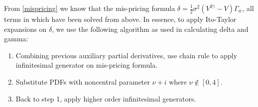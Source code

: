 From \eqref{mispricing} we know that the mis-pricing formula $\delta = \frac{1}{2} \sigma^2 (V^{2\gamma}-V) \Gamma_{\bar{w}}$, all terms in which have been solved from above. In essence, to apply Ito-Taylor expansions on $\delta$, we use the following algorithm as used in calculating delta and gamma:

\begin{enumerate}
    \item Combining previous auxiliary partial derivatives, use chain rule to apply infinitesimal generator on mis-pricing formula.
    \item Substitute PDFs with noncentral parameter $\nu+i$ where $\nu \notin [0,4]$.
    \item Back to step 1, apply higher order infinitesimal generators.
\end{enumerate}

